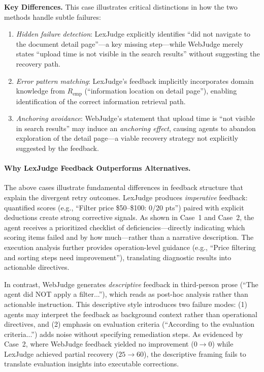 \textbf{Key Differences.} This case illustrates critical distinctions in how the two methods handle subtle failures:
\begin{enumerate}[leftmargin=*, nosep]
    \item \textit{Hidden failure detection}: LexJudge explicitly identifies ``did not navigate to the document detail page''---a key missing step---while WebJudge merely states ``upload time is not visible in the search results'' without suggesting the recovery path.
    \item \textit{Error pattern matching}: LexJudge's feedback implicitly incorporates domain knowledge from $R_{\text{emp}}$ (``information location on detail page''), enabling identification of the correct information retrieval path.
    \item \textit{Anchoring avoidance}: WebJudge's statement that upload time is ``not visible in search results'' may induce an \textit{anchoring effect}, causing agents to abandon exploration of the detail page---a viable recovery strategy not explicitly suggested by the feedback.
\end{enumerate}

\vspace{1em}
\paragraph{Why LexJudge Feedback Outperforms Alternatives.}

The above cases illustrate fundamental differences in feedback structure that explain the divergent retry outcomes. LexJudge produces \textit{imperative} feedback: quantified scores (e.g., ``Filter price \$50--\$100: 0/20 pts'') paired with explicit deductions create strong corrective signals. As shown in Case~1 and Case~2, the agent receives a prioritized checklist of deficiencies---directly indicating which scoring items failed and by how much---rather than a narrative description. The execution analysis further provides operation-level guidance (e.g., ``Price filtering and sorting steps need improvement''), translating diagnostic results into actionable directives.

In contrast, WebJudge generates \textit{descriptive} feedback in third-person prose (``The agent did NOT apply a filter...''), which reads as post-hoc analysis rather than actionable instruction. This descriptive style introduces two failure modes: (1) agents may interpret the feedback as background context rather than operational directives, and (2) emphasis on evaluation criteria (``According to the evaluation criteria...'') adds noise without specifying remediation steps. As evidenced by Case~2, where WebJudge feedback yielded no improvement ($0 \rightarrow 0$) while LexJudge achieved partial recovery ($25 \rightarrow 60$), the descriptive framing fails to translate evaluation insights into executable corrections.

